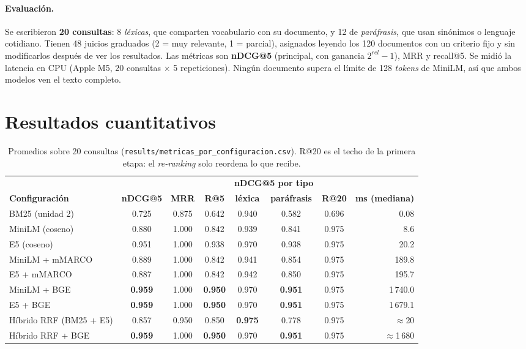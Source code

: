 \documentclass[10pt,a4paper]{article}
\begin{document}
\paragraph{Evaluación.} Se escribieron \textbf{20 consultas}: 8 \emph{léxicas}, que comparten
vocabulario con su documento, y 12 de \emph{paráfrasis}, que usan sinónimos o lenguaje cotidiano. Tienen
48 juicios graduados (2 = muy relevante, 1 = parcial), asignados leyendo los 120 documentos con un
criterio fijo y sin modificarlos después de ver los resultados. Las métricas son \textbf{nDCG@5} (principal, con ganancia $2^{rel}-1$), MRR y
recall@5. Se midió la latencia en CPU (Apple M5, 20 consultas $\times$ 5 repeticiones). Ningún documento
supera el límite de 128 \emph{tokens} de MiniLM, así que ambos modelos ven el texto completo.

\section{Resultados cuantitativos}

\begin{table}[H]
\centering\small
\begin{tabular}{@{}lccccccr@{}}
\toprule
& & & & \multicolumn{2}{c}{\textbf{nDCG@5 por tipo}} & & \\
\cmidrule(lr){5-6}
\textbf{Configuración} & \textbf{nDCG@5} & \textbf{MRR} & \textbf{R@5} & \textbf{léxica} & \textbf{paráfrasis} & \textbf{R@20} & \textbf{ms (mediana)} \\
\midrule
BM25 (unidad 2)              & 0.725 & 0.875 & 0.642 & 0.940 & 0.582 & 0.696 & 0.08 \\
MiniLM (coseno)              & 0.880 & 1.000 & 0.842 & 0.939 & 0.841 & 0.975 & 8.6 \\
E5 (coseno)                  & 0.951 & 1.000 & 0.938 & 0.970 & 0.938 & 0.975 & 20.2 \\
MiniLM + mMARCO              & 0.889 & 1.000 & 0.842 & 0.941 & 0.854 & 0.975 & 189.8 \\
E5 + mMARCO                  & 0.887 & 1.000 & 0.842 & 0.942 & 0.850 & 0.975 & 195.7 \\
MiniLM + BGE                 & \textbf{0.959} & 1.000 & \textbf{0.950} & 0.970 & \textbf{0.951} & 0.975 & 1\,740.0 \\
E5 + BGE                     & \textbf{0.959} & 1.000 & \textbf{0.950} & 0.970 & \textbf{0.951} & 0.975 & 1\,679.1 \\
Híbrido RRF (BM25 + E5)      & 0.857 & 0.950 & 0.850 & \textbf{0.975} & 0.778 & 0.975 & $\approx$20 \\
Híbrido RRF + BGE            & \textbf{0.959} & 1.000 & \textbf{0.950} & 0.970 & \textbf{0.951} & 0.975 & $\approx$1\,680 \\
\bottomrule
\end{tabular}
\caption{Promedios sobre 20 consultas (\texttt{results/metricas\_por\_configuracion.csv}). R@20 es el
techo de la primera etapa: el \emph{re-ranking} solo reordena lo que recibe.}
\end{table}
\end{document}
